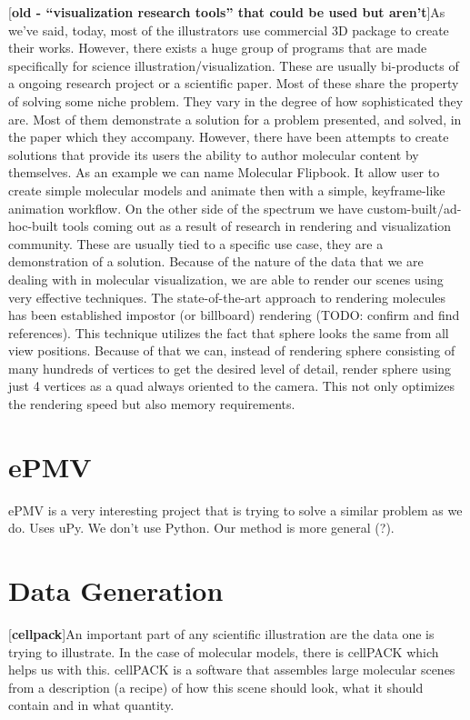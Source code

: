\documentclass[
  digital, %
  table,   %
  nolof,     %
  nolot,     %
]{fithesis3}
\begin{document}
[\textbf{old - ``visualization research tools'' that could be used but aren't}]As we've said, today, most of the illustrators use commercial 3D package to create their works. However, there exists a huge group of programs that are made specifically for science illustration/visualization. These are usually bi-products of a ongoing research project or a scientific paper. Most of these share the property of solving some niche problem. They vary in the degree of how sophisticated they are. Most of them demonstrate a solution for a problem presented, and solved, in the paper which they accompany. However, there have been attempts to create solutions that provide its users the ability to author molecular content by themselves. As an example we can name Molecular Flipbook. It allow user to create simple molecular models and animate then with a simple, keyframe-like animation workflow.
On the other side of the spectrum we have custom-built/ad-hoc-built tools coming out as a result of research in rendering and visualization community. These are usually tied to a specific use case, they are a demonstration of a solution. Because of the nature of the data that we are dealing with in molecular visualization, we are able to render our scenes using very effective techniques. The state-of-the-art approach to rendering molecules has been established impostor (or billboard) rendering (TODO: confirm and find references). This technique utilizes the fact that sphere looks the same from all view positions. Because of that we can, instead of rendering sphere consisting of many hundreds of vertices to get the desired level of detail, render sphere using just 4 vertices as a quad always oriented to the camera. This not only optimizes the rendering speed but also memory requirements.

\section{ePMV}
ePMV is a very interesting project that is trying to solve a similar problem as we do. Uses uPy. We don't use Python. Our method is more general (?).

\section{Data Generation}
[\textbf{cellpack}]An important part of any scientific illustration are the data one is trying to illustrate. In the case of molecular models, there is cellPACK which helps us with this. cellPACK is a software that assembles large molecular scenes from a description (a recipe) of how this scene should look, what it should contain and in what quantity.
\end{document}
